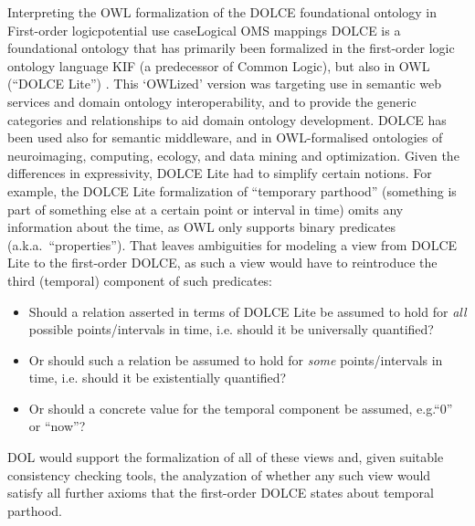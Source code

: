 \documentclass[10pt,%
\ifpretendfinal
final%
\else
draft%
\fi,
]{scrreprt}
\makeatletter
\newcommand*{\eg}{e.g.\@\xspace}
\newcommand*{\ie}{i.e.\@\xspace}
\makeatother
\begin{document}
\begin{usecase}{Interpreting the OWL formalization of the DOLCE foundational ontology in First-order logic}{potential use case}{Logical OMS mappings}
  DOLCE is a foundational ontology that has primarily been formalized in the first-order logic ontology language KIF (a predecessor of Common Logic), but also in OWL (``DOLCE Lite'') \cite{dolce}. This ‘OWLized’ version was targeting use in semantic web services and domain ontology interoperability, and to provide the generic categories and relationships to aid domain ontology development. DOLCE has been used also for semantic middleware, and in OWL-formalised ontologies of neuroimaging, computing, ecology, and data mining and optimization.
  Given the differences in expressivity, DOLCE Lite had to simplify certain notions.  For example, the DOLCE Lite formalization of ``temporary parthood'' (something is part of something else at a certain point or interval in time) omits any information about the time, as OWL only supports binary predicates (a.k.a.\ ``properties'').  That leaves ambiguities for modeling a view from DOLCE Lite to the first-order DOLCE, as such a view would have to reintroduce the third (temporal) component of such predicates:
  \begin{itemize}
  \item Should a relation asserted in terms of DOLCE Lite be assumed to hold for \emph{all} possible points/intervals in time, \ie should it be universally quantified?
  \item Or should such a relation be assumed to hold for \emph{some} points/intervals in time, \ie should it be existentially quantified?
  \item Or should a concrete value for the temporal component be assumed, \eg ``0'' or ``now''?
  \end{itemize}
  
  DOL would support the formalization of  all of these views and, given suitable consistency checking tools, the analyzation of  whether any such view would satisfy all further axioms that the first-order DOLCE states about temporal parthood.
\end{usecase}
\end{document}
